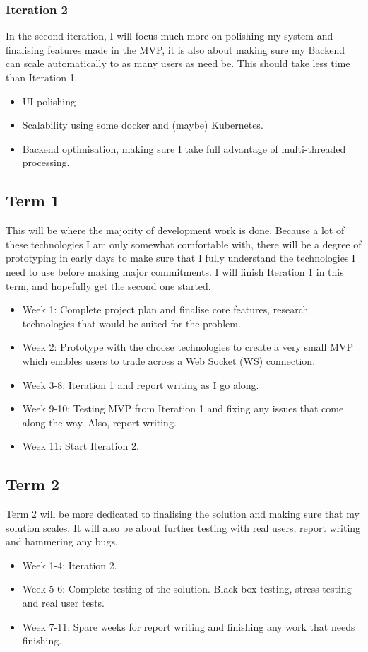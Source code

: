 \documentclass[titlepage]{article}
\begin{document}
\subsubsection{Iteration 2}
In the second iteration, I will focus much more on polishing my system and finalising features made in the MVP, it is also about making sure my Backend can scale automatically to as many users as need be. This should take less time than Iteration 1.
\begin{itemize}
	\item UI polishing
	\item Scalability using some docker and (maybe) Kubernetes.
	\item Backend optimisation, making sure I take full advantage of multi-threaded processing.
\end{itemize}

\subsection{Term 1}
This will be where the majority of development work is done. Because a lot of these technologies I am only somewhat comfortable with, there will be a degree of prototyping in early days to make sure that I fully understand the technologies I need to use before making major commitments. I will finish Iteration 1 in this term, and hopefully get the second one started.


\begin{itemize}
	\item Week 1: Complete project plan and finalise core features, research technologies that would be suited for the problem.
	\item Week 2: Prototype with the choose technologies to create a very small MVP which enables users to trade across a Web Socket (WS) connection.
	\item Week 3-8: Iteration 1 and report writing as I go along.
  \item Week 9-10: Testing MVP from Iteration 1 and fixing any issues that come along the way. Also, report writing.
  \item Week 11: Start Iteration 2.
\end{itemize}

\subsection{Term 2}
Term 2 will be more dedicated to finalising the solution and making sure that my solution scales. It will also be about further testing with real users, report writing and hammering any bugs.

\begin{itemize}
	\item Week 1-4: Iteration 2.
  \item Week 5-6: Complete testing of the solution. Black box testing, stress testing and real user tests.
  \item Week 7-11: Spare weeks for report writing and finishing any work that needs finishing.
\end{itemize}
\end{document}
